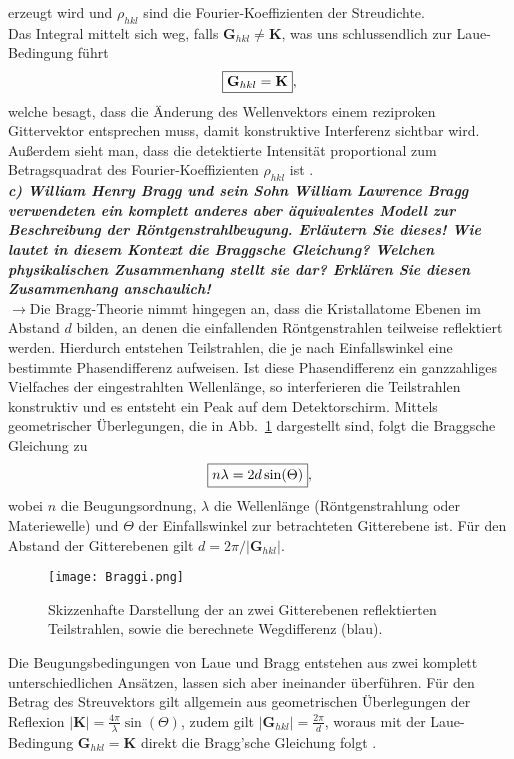 erzeugt wird und $\rho_{hkl}$ sind die Fourier-Koeffizienten der Streudichte. \\
Das Integral mittelt sich weg, falls $\mathbf{G}_{hkl}\neq \mathbf{K}$, was uns schlussendlich zur Laue-Bedingung führt
\begin{equation}
    \fbox{$\mathbf{G}_{hkl} = \mathbf{K}$},
\end{equation}  
welche besagt, dass die Änderung des Wellenvektors einem reziproken Gittervektor entsprechen muss, damit konstruktive Interferenz sichtbar wird. 
Außerdem sieht man, dass die detektierte Intensität proportional zum Betragsquadrat des Fourier-Koeffizienten $\rho_{hkl}$ ist \cite{EPC}. \\

\textbf{\textit{c) William Henry Bragg und sein Sohn William Lawrence Bragg verwendeten
ein komplett anderes aber äquivalentes Modell zur Beschreibung der
Röntgenstrahlbeugung. Erläutern Sie dieses! Wie lautet in diesem Kontext
die Braggsche Gleichung? Welchen physikalischen Zusammenhang
stellt sie dar? Erklären Sie diesen Zusammenhang anschaulich!}}\\
$\rightarrow$Die Bragg-Theorie nimmt hingegen an, dass die Kristallatome Ebenen im Abstand $d$ bilden, an denen die 
einfallenden Röntgenstrahlen teilweise reflektiert werden. Hierdurch entstehen Teilstrahlen, die je nach Einfallswinkel eine
bestimmte Phasendifferenz aufweisen. Ist diese Phasendifferenz ein ganzzahliges Vielfaches der eingestrahlten Wellenlänge, 
so interferieren die Teilstrahlen konstruktiv und es entsteht ein Peak auf dem Detektorschirm. Mittels geometrischer Überlegungen, 
die in Abb.~\ref{fig:bragg} dargestellt sind, folgt die Braggsche Gleichung zu
\begin{equation}\label{eq:bragg}
    \fbox{$n\lambda = 2d\sin(\Theta)$},
\end{equation} 
wobei $n$ die Beugungsordnung, $\lambda$ die Wellenlänge (Röntgenstrahlung oder Materiewelle) und $\Theta$ der Einfallswinkel zur betrachteten 
Gitterebene ist. Für den Abstand der Gitterebenen gilt $d = 2\pi/|\mathbf{G}_{hkl}|$.
\begin{figure}[h!]
    \centering
    \texttt{[image: Braggi.png]}
    \caption{\label{fig:bragg}Skizzenhafte Darstellung der an zwei Gitterebenen reflektierten Teilstrahlen, sowie 
    die berechnete Wegdifferenz (blau).}
\end{figure}\FloatBarrier
Die Beugungsbedingungen von Laue und Bragg entstehen aus zwei komplett unterschiedlichen Ansätzen, lassen sich aber ineinander überführen. 
Für den Betrag des Streuvektors gilt allgemein aus geometrischen Überlegungen der Reflexion $|\mathbf{K}| = \frac{4\pi}{\lambda}\sin(\Theta)$, 
zudem gilt $|\mathbf{G}_{hkl}| = \frac{2\pi}{d}$, woraus mit der Laue-Bedingung $\mathbf{G}_{hkl} = \mathbf{K}$ direkt die 
Bragg'sche Gleichung folgt \cite{EPC}. \\

